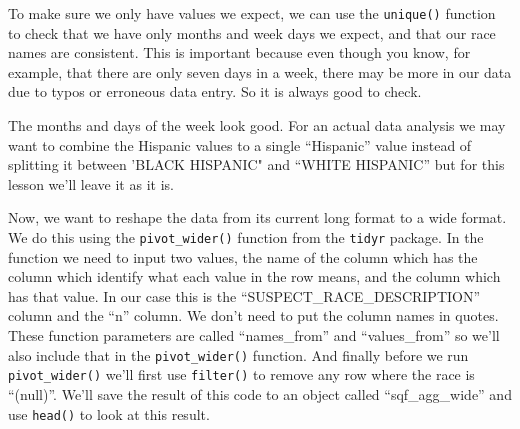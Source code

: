 \documentclass[
]{krantz}
\makeatletter
\newenvironment{Shaded}{\begin{snugshade}}{\end{snugshade}}
\newcommand{\CommentTok}[1]{\textcolor[rgb]{0.37,0.37,0.37}{\textit{#1}}}
\newcommand{\FunctionTok}[1]{\textcolor[rgb]{0,0,0}{#1}}
\newcommand{\NormalTok}[1]{#1}
\newcommand{\SpecialCharTok}[1]{\textcolor[rgb]{0,0,0}{#1}}
\newenvironment{kframe}{%
\medskip{}
\setlength{\fboxsep}{.8em}
 \def\at@end@of@kframe{}%
 \ifinner\ifhmode%
  \def\at@end@of@kframe{\end{minipage}}%
  \begin{minipage}{\columnwidth}%
 \fi\fi%
 \def\FrameCommand##1{\hskip\@totalleftmargin \hskip-\fboxsep
 \colorbox{shadecolor}{##1}\hskip-\fboxsep
     \hskip-\linewidth \hskip-\@totalleftmargin \hskip\columnwidth}%
 \MakeFramed {\advance\hsize-\width
   \@totalleftmargin\z@ \linewidth\hsize
   \@setminipage}}%
 {\par\unskip\endMakeFramed%
 \at@end@of@kframe}
\renewenvironment{Shaded}{\begin{kframe}}{\end{kframe}}
\makeatother
\begin{document}
To make sure we only have values we expect, we can use the \texttt{unique()} function to check that we have only months and week days we expect, and that our race names are consistent. This is important because even though you know, for example, that there are only seven days in a week, there may be more in our data due to typos or erroneous data entry. So it is always good to check.

\begin{Shaded}
\end{Shaded}

The months and days of the week look good. For an actual data analysis we may want to combine the Hispanic values to a single ``Hispanic'' value instead of splitting it between 'BLACK HISPANIC" and ``WHITE HISPANIC'' but for this lesson we'll leave it as it is.

Now, we want to reshape the data from its current long format to a wide format. We do this using the \texttt{pivot\_wider()} function from the \texttt{tidyr} package. In the function we need to input two values, the name of the column which has the column which identify what each value in the row means, and the column which has that value. In our case this is the ``SUSPECT\_RACE\_DESCRIPTION'' column and the ``n'' column. We don't need to put the column names in quotes. These function parameters are called ``names\_from'' and ``values\_from'' so we'll also include that in the \texttt{pivot\_wider()} function. And finally before we run \texttt{pivot\_wider()} we'll first use \texttt{filter()} to remove any row where the race is ``(null)''. We'll save the result of this code to an object called ``sqf\_agg\_wide'' and use \texttt{head()} to look at this result.
\end{document}
